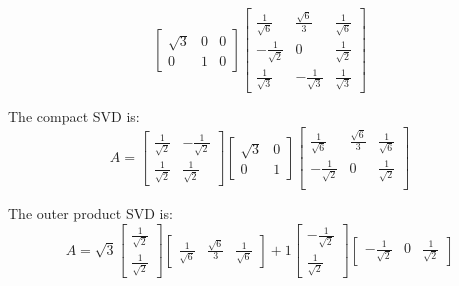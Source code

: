 \begin{enumerate}
{\begin{equation}
      \begin{bmatrix} \sqrt{3} & 0 & 0 \\ 0 & 1 & 0 \end{bmatrix}
      \begin{bmatrix} \frac{1}{\sqrt{6}} & \frac{\sqrt{6}}{3} & \frac{1}{\sqrt{6}} \\
      -\frac{1}{\sqrt{2}} & 0 & \frac{1}{\sqrt{2}} \\
      \frac{1}{\sqrt{3}} & - \frac{1}{\sqrt{3}} & \frac{1}{\sqrt{3}} \end{bmatrix}
    \end{equation}

    The compact SVD is:
    \begin{equation}
      A = \begin{bmatrix} \frac{1}{\sqrt{2}} & -\frac{1}{\sqrt{2}} \\ \frac{1}{\sqrt{2}} & \frac{1}{\sqrt{2}} \end{bmatrix}
      \begin{bmatrix} \sqrt{3} & 0 \\ 0 & 1 \end{bmatrix}
      \begin{bmatrix} \frac{1}{\sqrt{6}} & \frac{\sqrt{6}}{3} & \frac{1}{\sqrt{6}} \\
      -\frac{1}{\sqrt{2}} & 0 & \frac{1}{\sqrt{2}} \\ \end{bmatrix}
    \end{equation}

    The outer product SVD is:
    \begin{equation}
      A = \sqrt{3} \begin{bmatrix} \frac{1}{\sqrt{2}} \\ \frac{1}{\sqrt{2}} \end{bmatrix} \begin{bmatrix} \frac{1}{\sqrt{6}} & \frac{\sqrt{6}}{3} & \frac{1}{\sqrt{6}} \end{bmatrix}
        + 1 \begin{bmatrix} -\frac{1}{\sqrt{2}} \\ \frac{1}{\sqrt{2}} \end{bmatrix} \begin{bmatrix} -\frac{1}{\sqrt{2}} & 0 & \frac{1}{\sqrt{2}} \end{bmatrix}
    \end{equation}
  }



\end{enumerate}
